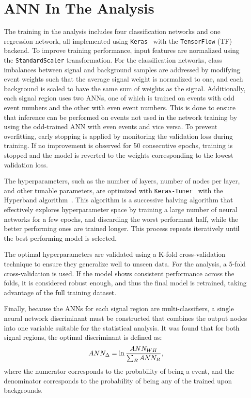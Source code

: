\section{ANN In The \vh{} Analysis}
The training in the \vh{} analysis includes four classification networks and one regression network, all implemented using \texttt{Keras}~\cite{chollet2015keras} with the \texttt{TensorFlow} (TF)~\cite{tensorflow2015-whitepaper} backend. To improve training performance, input features are normalized using the \texttt{StandardScaler} transformation. For the classification networks, class imbalances between signal and background samples are addressed by modifying event weights such that the average signal weight is normalized to one, and each background is scaled to have the same sum of weights as the signal. Additionally, each signal region uses two ANNs, one of which is trained on events with odd event numbers and the other with even event numbers. This is done to ensure that inference can be performed on events not used in the network training by using the odd-trained ANN with even events and vice versa. To prevent overfitting, early stopping is applied by monitoring the validation loss during training. If no improvement is observed for 50 consecutive epochs, training is stopped and the model is reverted to the weights corresponding to the lowest validation loss.

The hyperparameters, such as the number of layers, number of nodes per layer, and other tunable parameters, are optimized with \texttt{Keras-Tuner}~\cite{omalley2019kerastuner} with the Hyperband algorithm~\cite{li2018hyperband}. This algorithm is a successive halving algorithm that effectively explores hyperparameter space by training a large number of neural networks for a few epochs, and discarding the worst performant half, while the better performing ones are trained longer. This process repeats iteratively until the best performing model is selected.

The optimal hyperparameters are validated using a K-fold cross-validation technique to ensure they generalize well to unseen data. For the \wh{} analysis, a 5-fold cross-validation is used. If the model shows consistent performance across the folds, it is considered robust enough, and thus the final model is retrained, taking advantage of the full training dataset.

Finally, because the ANNs for each signal region are multi-classifiers, a single neural network discriminant must be constructed that combines the output nodes into one variable suitable for the statistical analysis. It was found that for both signal regions, the optimal discriminant is defined as:
\begin{equation}
  ANN_{\Delta} = \ln{\frac{ANN_{\ensuremath{WH}}}{\sum_{B}ANN_{B}}},
  \label{eq:NN_discriminant}
\end{equation}
where the numerator corresponds to the probability of being a \wh{} event, and the denominator corresponds to the probability of being any of the trained upon backgrounds.

